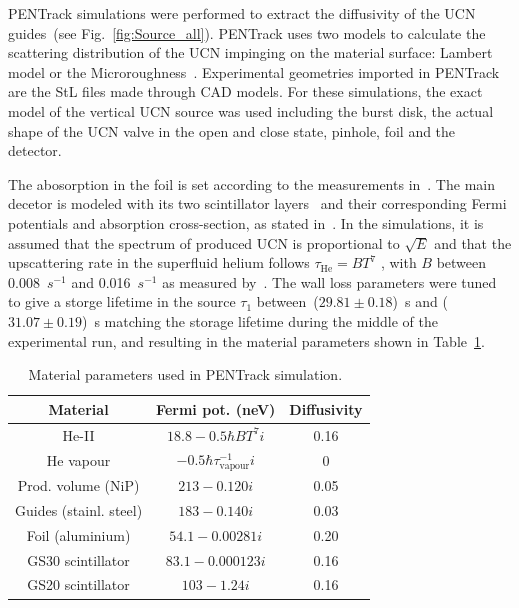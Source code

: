 PENTrack simulations were performed to extract the diffusivity of the
UCN guides~(see Fig.~\ref{fig:Source_all}). PENTrack uses two models
to calculate the scattering distribution of the UCN impinging on the
material surface: Lambert model or the
Microroughness~\cite{Steyerl1972}. Experimental geometries imported in
PENTrack are the StL files made through CAD models. For these
simulations, the exact model of the vertical UCN source was used
including the burst disk, the actual shape of the UCN valve in the
open and close state, pinhole, foil and the detector.

The abosorption in the foil is set according to the measurements
in~\cite{atchison2009transmission}. The main decetor is modeled with
its two scintillator layers~\cite{jamieson2017characterization} and
their corresponding Fermi potentials and absorption cross-section, as
stated in~\cite{Ban2016}. In the simulations, it is assumed that the
spectrum of produced UCN is proportional to $\sqrt{E}$ and that the
upscattering rate in the superfluid helium follows
$\tau_\mathrm{He} = B T^7$ , with $B$ between 0.008~$s^{-1}$ and
0.016~$s^{-1}$ as measured by~\cite{Leung2016}. The wall loss
parameters were tuned to give a storge lifetime in the source $\tau_1$
between~($29.81 \pm 0.18$)~s and ($31.07 \pm 0.19$)~s matching the
storage lifetime during the middle of the experimental run, and
resulting in the material parameters shown in
Table~\ref{tab:materials}.




\begin{table}
  \centering
\begin{tabular}{|c|c|c|}
  \hline
Material & Fermi pot. (neV) & Diffusivity \\
\hline
  He-II  & $18.8 - 0.5\hbar B T^7 i$ & 0.16 \\
  He vapour & $-0.5 \hbar \tau^{-1}_\mathrm{vapour} i$ & 0 \\
  Prod. volume (NiP) & $213 - 0.120 i$ & 0.05 \\
  Guides (stainl. steel) & $183 - 0.140 i$ & 0.03 \\
  Foil (aluminium) & $54.1 - 0.00281 i$ & 0.20 \\
  GS30 scintillator & $83.1 - 0.000123 i$ & 0.16 \\
  GS20 scintillator & $103 - 1.24 i$ & 0.16 \\
  \hline
\end{tabular}
\caption{Material parameters used in PENTrack
  simulation.~\cite{atchison2009transmission,Ban2016,sears1992neutron}}
\label{tab:materials}
\end{table}

